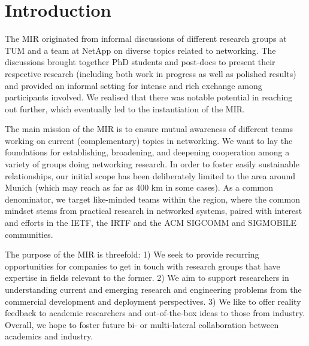 \section{Introduction}\label{sec:introduction}


The \ac{MIR} originated from informal discussions of different research groups
at TUM and a team at NetApp on diverse topics related to networking. The
discussions brought together PhD students and post-docs to present their
respective research (including both work in progress as well as polished
results) and provided an informal setting for intense and rich exchange among
participants involved.  We realised that there was notable potential in
reaching out further, which eventually led to the instantiation of the
\ac{MIR}.

The main mission of the \ac{MIR} is to ensure mutual awareness of different
teams working on current (complementary) topics in networking. We want to lay
the foundations for establishing, broadening, and deepening cooperation among
a variety of groups doing networking research. In order to foster easily
sustainable relationships, our initial scope has been deliberately limited to
the area around Munich (which may reach as far as 400 km in some cases).  As a
common denominator, we target like-minded teams within the region, where the
common mindset stems from practical research in networked systems, paired with
interest and efforts in the \ac{IETF}, the \ac{IRTF} and the ACM SIGCOMM and
SIGMOBILE communities.

The purpose of the \ac{MIR} is threefold: 1) We seek to provide recurring
opportunities for companies to get in touch with research groups that have
expertise in fields relevant to the former.  2) We aim to support researchers
in understanding current and emerging research and engineering problems from
the commercial development and deployment perspectives.  3) We like to offer
reality feedback to academic researchers and out-of-the-box ideas to those
from industry.  Overall, we hope to foster future bi- or multi-lateral
collaboration between academics and industry.

